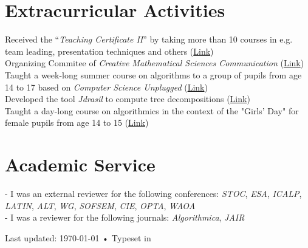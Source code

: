 \documentclass[10pt, a4paper]{article}
\newcommand{\years}[1]{\marginnote{\scriptsize #1}}
\begin{document}
\section*{Extracurricular Activities}
\years{2012--2015}Received the ``\emph{Teaching Certificate II}'' by taking
more than 10 courses in e.g. team leading, presentation techniques and
others (\href{https://www.uni-luebeck.de/universitaet/einrichtungen/dozierenden-service-center/hochschuldidaktik/zertifikatsprogramm.html}{Link})\\
\years{2016}Organizing Commitee of \emph{Creative Mathematical Sciences
  Communication} (\href{http://www.tcs.uni-luebeck.de/cmsc/}{Link})\\
\years{2016}Taught a week-long summer course on algorithms to a group of
pupils from age 14 to 17 based on \emph{Computer Science Unplugged}
(\href{https://www.lias.uni-luebeck.de/veranstaltungen/isc/isc16.html}{Link})\\
\years{2016}Developed the tool \emph{Jdrasil} to compute tree
decompositions (\href{https://github.com/maxbannach/Jdrasil}{Link})\\
\years{2018}Taught a day-long course on algorithmics in the context of the
"Girls' Day" for female pupils from age 14 to 15 (\href{https://www.inf.uni-kiel.de/de/aktuelles/girls-day-am-insitut-fuer-informatik}{Link})

\section*{Academic Service}
- I was an external reviewer for the following conferences: \emph{STOC}, \emph{ESA}, \emph{ICALP},
\emph{LATIN},
\emph{ALT}, \emph{WG}, \emph{SOFSEM}, \emph{CIE}, \emph{OPTA}, \emph{WAOA}\\
- I was a reviewer for the following journals: \emph{Algorithmica}, \emph{JAIR}





\vspace{-.05cm}
\vfill{}
\begin{center}

{\scriptsize  Last updated: \today\- •\- Typeset in \href{http://nitens.org/taraborelli/cvtex}{
  \XeLaTeX}\\
}
\end{center}
\end{document}
